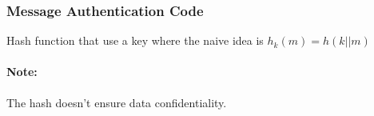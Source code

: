 \subsubsection{Message Authentication Code} 
Hash function that use a key where the naive idea is $h_k(m) = h(k||m)$
\paragraph{Note:} The hash doesn't ensure data confidentiality.

